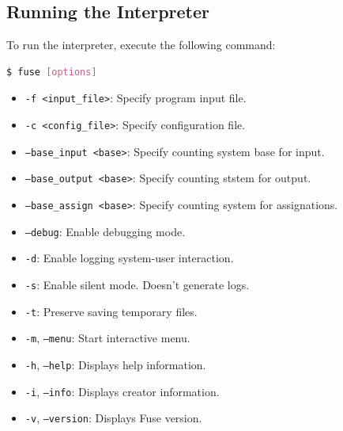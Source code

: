 \documentclass[a4paper,12pt]{article}
\begin{document}
\subsection{Running the Interpreter}
To run the interpreter, execute the following command:
\begin{lstlisting}[language=bash]
$ fuse [options]
\end{lstlisting}
\begin{itemize}
	\item \texttt{-f <input\_file>}: Specify program input file.
	\item \texttt{-c <config\_file>}: Specify configuration file.
	\item \texttt{--base\_input <base>}: Specify counting system base for input.
	\item \texttt{--base\_output <base>}: Specify counting ststem for output.
	\item \texttt{--base\_assign <base>}: Specify counting system for assignations.
	\item \texttt{--debug}: Enable debugging mode.
	\item \texttt{-d}: Enable logging system-user interaction.
	\item \texttt{-s}: Enable silent mode. Doesn't generate logs.
	\item \texttt{-t}: Preserve saving temporary files.
	\item \texttt{-m}, \texttt{--menu}: Start interactive menu.
	\item \texttt{-h}, \texttt{--help}: Displays help information.
	\item \texttt{-i}, \texttt{--info}: Displays creator information.
	\item \texttt{-v}, \texttt{--version}: Displays Fuse version.
\end{itemize}
\end{document}
